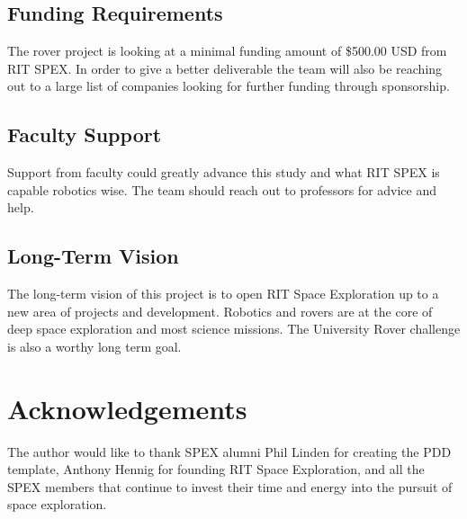 \documentclass[conference]{IEEEtran} %
\begin{document}
\subsection{Funding Requirements}

The rover project is looking at a minimal funding amount of \$500.00 USD from RIT SPEX. In order to give a better deliverable the team will also be reaching out to a large list of companies looking for further funding through sponsorship. 

\subsection{Faculty Support}
Support from faculty could greatly advance this study and what RIT SPEX is capable robotics wise. The team should reach out to professors for advice and help.

\subsection{Long-Term Vision}
\label{sec:vision}
The long-term vision of this project is to open RIT Space Exploration up to a new area of projects and development. 
Robotics and rovers are at the core of deep space exploration and most science missions. 
The University Rover challenge is also a worthy long term goal. 

\section*{Acknowledgements}
The author would like to thank SPEX alumni Phil Linden for creating the PDD template, Anthony Hennig for founding RIT Space Exploration, and all the SPEX members that continue to invest their time and energy into the pursuit of space exploration.




\onecolumn
\appendices{}
\end{document}

